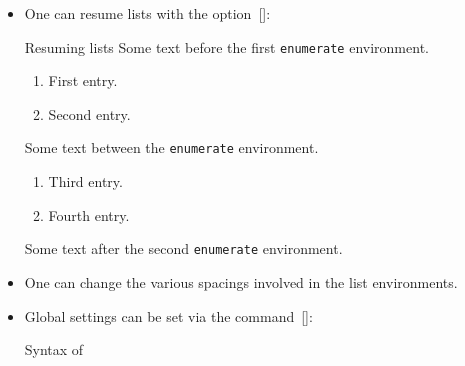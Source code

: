 \begin{itemize}
\begin{table}[tb]
\begin{center}
      \end{center}
      \caption{Possible labels for the environment~.}
      \label{enumitem labels}
    \end{table}
    One can similarly change the symbol for~ lists via the option~[\optname]:
    \begin{showlatex}*{Changing the symbol for~ lists}
With the standard symbol:
\begin{itemize}[label = {\textbullet}]
  \item
    First entry.
  \item
    Second entry.
\end{itemize}
Now with a different symbol:
\begin{itemize}[label = {\textopenbullet}]
  \item
    First entry again.
  \item
    Second entry again.
\end{itemize}
    \end{showlatex}
  \item
    One can resume lists with the option~[\optname]:
    \begin{showlatex}{Resuming lists}
Some text before the first \texttt{enumerate} environment.
\begin{enumerate}
  \item
    First entry.
  \item
    Second entry.
\end{enumerate}
Some text between the \texttt{enumerate} environment.
\begin{enumerate}[resume]
  \item
    Third entry.
  \item
    Fourth entry.
\end{enumerate}
Some text after the second \texttt{enumerate} environment.
    \end{showlatex}
  \item
    One can change the various spacings involved in the list environments.
  \item
    Global settings can be set via the command~[\optname]:
    \begin{showcode}{Syntax of~}
    \end{showcode}

\end{itemize}
